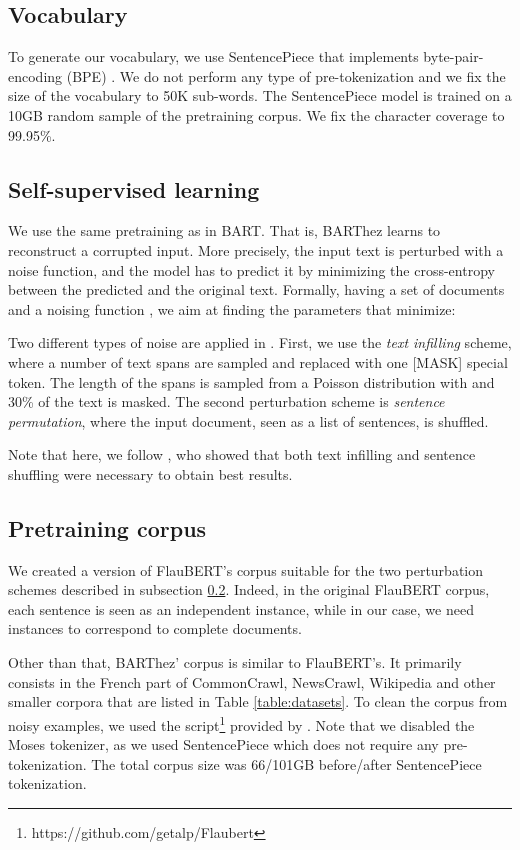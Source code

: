 \documentclass[11pt,a4paper]{article}
\begin{document}
\subsection{Vocabulary}
To generate our vocabulary, we use SentencePiece \citep{kudo2018sentencepiece} that implements byte-pair-encoding (BPE) \citep{sennrich2015neural}.
We do not perform any type of pre-tokenization and we fix the size of the vocabulary to 50K sub-words. The SentencePiece model is trained on a 10GB random sample of the pretraining corpus.
We fix the character coverage to 99.95\%. 

\subsection{Self-supervised learning} \label{subsec:pretraining}
We use the same pretraining as in BART.
That is, BARThez learns to reconstruct a corrupted input.
More precisely, the input text is perturbed with a noise function, and the model has to predict it by minimizing the cross-entropy between the predicted and the original text.
Formally, having a set of documents  and a noising function , we aim at finding the parameters  that minimize:



Two different types of noise are applied in .
First, we use the \textit{text infilling} scheme, where a number of text spans are sampled and replaced with one [MASK] special token.
The length of the spans is sampled from a Poisson distribution with  and 30\% of the text is masked.
The second perturbation scheme is \textit{sentence permutation}, where the input document, seen as a list of sentences, is shuffled.

Note that here, we follow \citet{lewis2019bart}, who showed that both text infilling and sentence shuffling were necessary to obtain best results.

\subsection{Pretraining corpus} \label{subsec:pretraining_corpus}
We created a version of FlauBERT's corpus \cite{le2019flaubert} suitable for the two perturbation schemes described in subsection \ref{subsec:pretraining}.
Indeed, in the original FlauBERT corpus, each sentence is seen as an independent instance, while in our case, we need instances to correspond to complete documents.

Other than that, BARThez' corpus is similar to FlauBERT's. 
It primarily consists in the French part of CommonCrawl, NewsCrawl, Wikipedia and other smaller corpora that are listed in Table \ref{table:datasets}.
To clean the corpus from noisy examples, we used the script\footnote{https://github.com/getalp/Flaubert} provided by \citet{le2019flaubert}.
Note that we disabled the Moses tokenizer, as we used SentencePiece which does not require any pre-tokenization.
The total corpus size was 66/101GB before/after SentencePiece tokenization.
\end{document}
